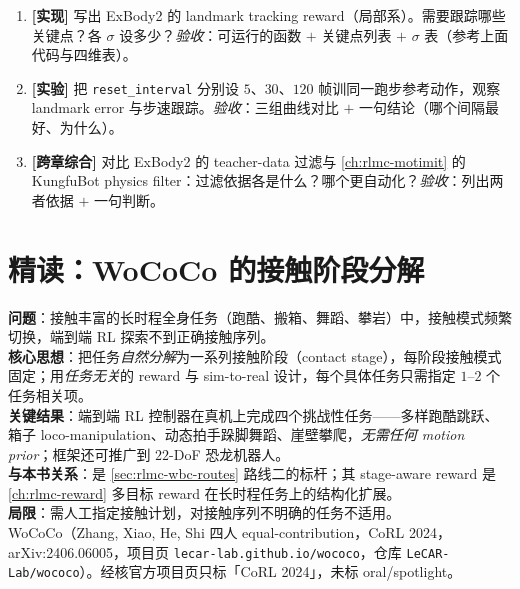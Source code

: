 \begin{practice}[本节动手]
\begin{enumerate}
  \item \textbf{[实现]} 写出 ExBody2 的 landmark tracking reward（局部系）。需要跟踪哪些关键点？各 $\sigma$ 设多少？\emph{验收}：可运行的函数 $+$ 关键点列表 $+$ $\sigma$ 表（参考上面代码与四维表）。
  \item \textbf{[实验]} 把 \verb|reset_interval| 分别设 $5$、$30$、$120$ 帧训同一跑步参考动作，观察 landmark error 与步速跟踪。\emph{验收}：三组曲线对比 $+$ 一句结论（哪个间隔最好、为什么）。
  \item \textbf{[跨章综合]} 对比 ExBody2 的 teacher-data 过滤与 \cref{ch:rlmc-motimit} 的 KungfuBot physics filter：过滤依据各是什么？哪个更自动化？\emph{验收}：列出两者依据 $+$ 一句判断。
\end{enumerate}
\end{practice}

\section{精读：WoCoCo 的接触阶段分解}\label{sec:rlmc-wbc-wococo}

\begin{paper}\label{paper:rlmc-wbc-wococo}
\textbf{问题}：接触丰富的长时程全身任务（跑酷、搬箱、舞蹈、攀岩）中，接触模式频繁切换，端到端 RL 探索不到正确接触序列。\\
\textbf{核心思想}：把任务\emph{自然分解}为一系列接触阶段（contact stage），每阶段接触模式固定；用\emph{任务无关}的 reward 与 sim-to-real 设计，每个具体任务只需指定 $1$--$2$ 个任务相关项。\\
\textbf{关键结果}：端到端 RL 控制器在真机上完成四个挑战性任务——多样跑酷跳跃、箱子 loco-manipulation、动态拍手跺脚舞蹈、崖壁攀爬，\emph{无需任何 motion prior}；框架还可推广到 $22$-DoF 恐龙机器人。\\
\textbf{与本书关系}：是 \cref{sec:rlmc-wbc-routes} 路线二的标杆；其 stage-aware reward 是 \cref{ch:rlmc-reward} 多目标 reward 在长时程任务上的结构化扩展。\\
\textbf{局限}：需人工指定接触计划，对接触序列不明确的任务不适用。\\
WoCoCo（Zhang, Xiao, He, Shi 四人 equal-contribution，CoRL 2024，arXiv:2406.06005，项目页 \texttt{lecar-lab.github.io/wococo}，仓库 \texttt{LeCAR-Lab/wococo}）\cite{zhang2024wococo}。经核官方项目页只标「CoRL 2024」，未标 oral/spotlight。
\end{paper}

